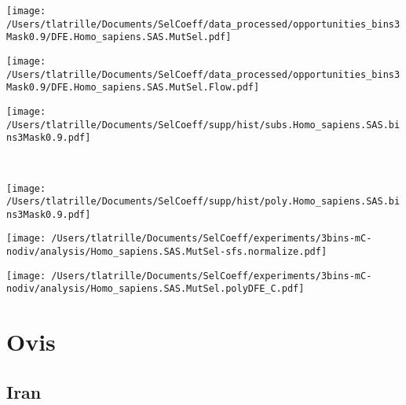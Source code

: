 \documentclass{article}
\begin{document}
    \begin{minipage}{0.32\linewidth}
        \texttt{[image: /Users/tlatrille/Documents/SelCoeff/data\_processed/opportunities\_bins3Mask0.9/DFE.Homo\_sapiens.SAS.MutSel.pdf]}
    \end{minipage}
    \begin{minipage}{0.32\linewidth}
        \texttt{[image: /Users/tlatrille/Documents/SelCoeff/data\_processed/opportunities\_bins3Mask0.9/DFE.Homo\_sapiens.SAS.MutSel.Flow.pdf]}
    \end{minipage}
    \begin{minipage}{0.32\linewidth}
        \texttt{[image: /Users/tlatrille/Documents/SelCoeff/supp/hist/subs.Homo\_sapiens.SAS.bins3Mask0.9.pdf]}
    \end{minipage}
    \\
    \begin{minipage}{0.32\linewidth}
        \texttt{[image: /Users/tlatrille/Documents/SelCoeff/supp/hist/poly.Homo\_sapiens.SAS.bins3Mask0.9.pdf]}
    \end{minipage}
    \begin{minipage}{0.32\linewidth}
        \texttt{[image: /Users/tlatrille/Documents/SelCoeff/experiments/3bins-mC-nodiv/analysis/Homo\_sapiens.SAS.MutSel-sfs.normalize.pdf]}
    \end{minipage}
    \begin{minipage}{0.32\linewidth}
        \texttt{[image: /Users/tlatrille/Documents/SelCoeff/experiments/3bins-mC-nodiv/analysis/Homo\_sapiens.SAS.MutSel.polyDFE\_C.pdf]}
    \end{minipage}
    \section{Ovis}

    \subsection{Iran}
\end{document}
